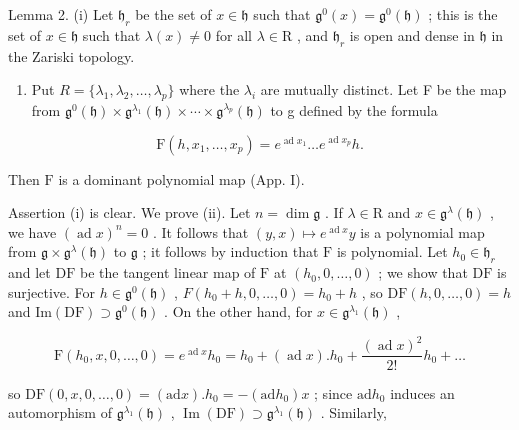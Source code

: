 Lemma 2. (i) Let \(\mathfrak{h}_r\) be the set of \(x\in \mathfrak{h}\) such that \(\mathfrak{g}^0 (x) = \mathfrak{g}^0 (\mathfrak{h})\) ; this is the set of \(x\in \mathfrak{h}\) such that \(\lambda (x)\neq 0\) for all \(\lambda \in \mathrm{R}\) , and \(\mathfrak{h}_r\) is open and dense in \(\mathfrak{h}\) in the Zariski topology.

\begin{enumerate}
\def\labelenumi{(\roman{enumi})}
\setcounter{enumi}{1}
\tightlist
\item
  Put \(R = \{\lambda_{1}, \lambda_{2}, \ldots, \lambda_{p}\}\) where the \(\lambda_{i}\) are mutually distinct. Let F be the map from \(\mathfrak{g}^{0}(\mathfrak{h}) \times \mathfrak{g}^{\lambda_{1}}(\mathfrak{h}) \times \cdots \times \mathfrak{g}^{\lambda_{p}}(\mathfrak{h})\) to g defined by the formula
\end{enumerate}

\[
\mathrm{F} (h, x _ {1}, \dots , x _ {p}) = e ^ {\operatorname{ad} x _ {1}} \dots e ^ {\operatorname{ad} x _ {p}} h.
\]

Then \(\mathrm{F}\) is a dominant polynomial map (App. I).

Assertion (i) is clear. We prove (ii). Let \(n = \dim \mathfrak{g}\) . If \(\lambda \in \mathrm{R}\) and \(x \in \mathfrak{g}^{\lambda}(\mathfrak{h})\) , we have \((\operatorname{ad} x)^n = 0\) . It follows that \((y, x) \mapsto e^{\operatorname{ad} x} y\) is a polynomial map from \(\mathfrak{g} \times \mathfrak{g}^{\lambda}(\mathfrak{h})\) to \(\mathfrak{g}\) ; it follows by induction that \(\mathrm{F}\) is polynomial. Let \(h_0 \in \mathfrak{h}_r\) and let \(\mathrm{DF}\) be the tangent linear map of \(\mathrm{F}\) at \((h_0, 0, \ldots, 0)\) ; we show that \(\mathrm{DF}\) is surjective. For \(h \in \mathfrak{g}^{0}(\mathfrak{h})\) , \(F(h_{0} + h, 0, \ldots, 0) = h_{0} + h\) , so \(\mathrm{DF}(h, 0, \ldots, 0) = h\) and \(\mathrm{Im}(\mathrm{DF}) \supset \mathfrak{g}^{0}(\mathfrak{h})\) . On the other hand, for \(x \in \mathfrak{g}^{\lambda_{1}}(\mathfrak{h})\) ,

\[
\mathrm{F} (h _ {0}, x, 0, \dots , 0) = e ^ {\operatorname{ad} x} h _ {0} = h _ {0} + (\operatorname{ad} x). h _ {0} + \frac {(\operatorname{ad} x) ^ {2}}{2 !} h _ {0} + \dots
\]

so \(\mathrm{DF}(0,x,0,\ldots ,0) = (\mathrm{ad}x).h_0 = -(\mathrm{ad}h_0)x\) ; since \(\mathrm{ad}h_0\) induces an automorphism of \(\mathfrak{g}^{\lambda_1}(\mathfrak{h})\) , \(\operatorname {Im}(\mathrm{DF})\supset \mathfrak{g}^{\lambda_1}(\mathfrak{h})\) . Similarly,

